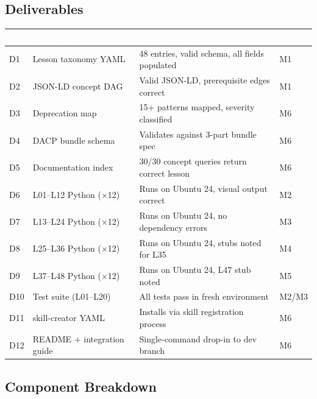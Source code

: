 \documentclass[11pt,letterpaper]{article}
\newcommand{\tableheader}[1]{\textbf{\sffamily\textcolor{white}{#1}}}
\begin{document}
\subsection{Deliverables}

\begin{center}
\begin{tabularx}{\textwidth}{C{0.5cm}L{4cm}XL{2cm}}
\toprule
{}
\tableheader{\#} & \tableheader{Deliverable} & \tableheader{Acceptance Criteria} & \tableheader{Spec} \\
\midrule
D1 & Lesson taxonomy YAML & 48 entries, valid schema, all fields populated & M1 \\
D2 & JSON-LD concept DAG & Valid JSON-LD, prerequisite edges correct & M1 \\
D3 & Deprecation map & 15+ patterns mapped, severity classified & M6 \\
D4 & DACP bundle schema & Validates against 3-part bundle spec & M6 \\
D5 & Documentation index & 30/30 concept queries return correct lesson & M6 \\
D6 & L01--L12 Python (×12) & Runs on Ubuntu 24, visual output correct & M2 \\
D7 & L13--L24 Python (×12) & Runs on Ubuntu 24, no dependency errors & M3 \\
D8 & L25--L36 Python (×12) & Runs on Ubuntu 24, stubs noted for L35 & M4 \\
D9 & L37--L48 Python (×12) & Runs on Ubuntu 24, L47 stub noted & M5 \\
D10 & Test suite (L01--L20) & All tests pass in fresh environment & M2/M3 \\
D11 & skill-creator YAML & Installs via skill registration process & M6 \\
D12 & README + integration guide & Single-command drop-in to dev branch & M6 \\
\bottomrule
\end{tabularx}
\end{center}

\subsection{Component Breakdown}
\end{document}
